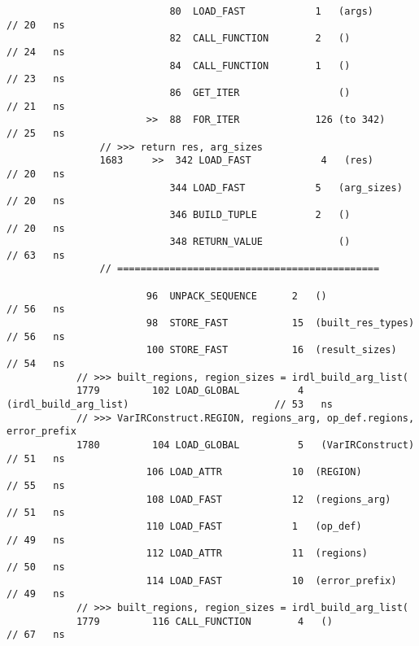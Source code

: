 \begin{code}
\begin{verbatim}
                            80  LOAD_FAST            1   (args)                                     // 20   ns
                            82  CALL_FUNCTION        2   ()                                         // 24   ns
                            84  CALL_FUNCTION        1   ()                                         // 23   ns
                            86  GET_ITER                 ()                                         // 21   ns
                        >>  88  FOR_ITER             126 (to 342)                                   // 25   ns
                // >>> return res, arg_sizes
                1683     >>  342 LOAD_FAST            4   (res)                                     // 20   ns
                            344 LOAD_FAST            5   (arg_sizes)                                // 20   ns
                            346 BUILD_TUPLE          2   ()                                         // 20   ns
                            348 RETURN_VALUE             ()                                         // 63   ns
                // =============================================

                        96  UNPACK_SEQUENCE      2   ()                                             // 56   ns
                        98  STORE_FAST           15  (built_res_types)                              // 56   ns
                        100 STORE_FAST           16  (result_sizes)                                 // 54   ns
            // >>> built_regions, region_sizes = irdl_build_arg_list(
            1779         102 LOAD_GLOBAL          4   (irdl_build_arg_list)                         // 53   ns
            // >>> VarIRConstruct.REGION, regions_arg, op_def.regions, error_prefix
            1780         104 LOAD_GLOBAL          5   (VarIRConstruct)                              // 51   ns
                        106 LOAD_ATTR            10  (REGION)                                       // 55   ns
                        108 LOAD_FAST            12  (regions_arg)                                  // 51   ns
                        110 LOAD_FAST            1   (op_def)                                       // 49   ns
                        112 LOAD_ATTR            11  (regions)                                      // 50   ns
                        114 LOAD_FAST            10  (error_prefix)                                 // 49   ns
            // >>> built_regions, region_sizes = irdl_build_arg_list(
            1779         116 CALL_FUNCTION        4   ()                                            // 67   ns


\end{verbatim}
\end{code}
